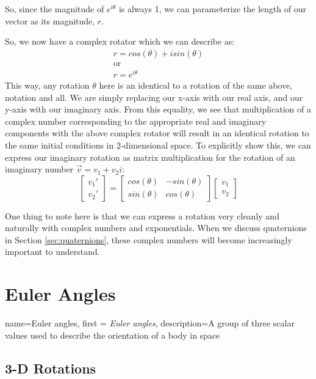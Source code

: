 \documentclass[12pt]{report}
\begin{document}
So, since the magnitude of $e^{i\theta}$ is always 1, we can parameterize the length of our vector as its magnitude, $r$.

So, we now have a complex rotator which we can describe as:
\begin{gather}
    r=cos(\theta)+isin(\theta)\\
    \text{or}\\
    r=e^{i\theta}
\end{gather}
This way, any rotation $\theta$ here is an identical to a rotation of the same above, notation and all. We are simply replacing our x-axis with our real axis, and our y-axis with our imaginary axis. From this equality, we see that multiplication of a complex number corresponding to the appropriate real and imaginary components with the above complex rotator will result in an identical rotation to the same initial conditions in 2-dimensional space. To explicitly show this, we can express our imaginary rotation as matrix multiplication for the rotation of an imaginary number $\vec{v}=v_1+v_2i$:
$$\begin{bmatrix}
    v_1'\\v_2'
\end{bmatrix}=
\begin{bmatrix}
    cos(\theta)&-sin(\theta)\\sin(\theta)&cos(\theta)
\end{bmatrix}\begin{bmatrix}
    v_1\\v_2
\end{bmatrix}$$

One thing to note here is that we can express a rotation very cleanly and naturally with complex numbers and exponentials. When we discuss quaternions in Section \ref{sec:quaternions}, these complex numbers will become increasingly important to understand.
\section{Euler Angles}

{
    name=Euler angles,
    first = {\textit{Euler angles}},
    description={A group of three scalar values used to describe the orientation of a body in space}
}



\subsection{3-D Rotations}\label{sec:3DRotations}
\end{document}
